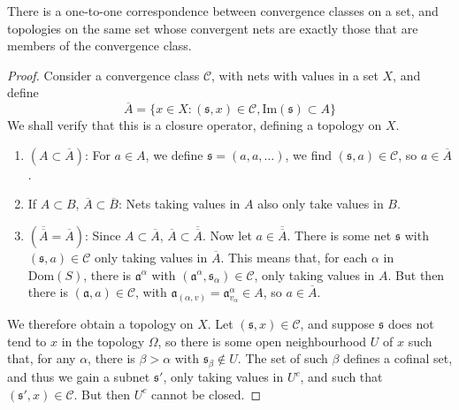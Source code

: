 \begin{theorem}
    There is a one-to-one correspondence between convergence classes on a set, and topologies on the same set whose convergent nets are exactly those that are members of the convergence class.
\end{theorem}
\begin{proof}
    Consider a convergence class $\mathcal{C}$, with nets with values in a set $X$, and define
    \[ \overline{A} = \{ x \in X : (\mathfrak{s}, x) \in \mathcal{C}, \text{Im}(\mathfrak{s}) \subset A \} \]
    We shall verify that this is a closure operator, defining a topology on $X$.
    \begin{enumerate}
        \item $(A \subset \overline{A})$: For $a \in A$, we define $\mathfrak{s} = (a,a,\dots)$, we find $(\mathfrak{s},a) \in \mathcal{C}$, so $a \in \overline{A}$.
        \item If $A \subset B$, $\overline{A} \subset \overline{B}$: Nets taking values in $A$ also only take values in $B$.
        \item $(\overline{\overline{A}} = \overline{A})$: Since $A \subset \overline{A}$, $\overline{A} \subset \overline{\overline{A}}$. Now let $a \in \overline{\overline{A}}$. There is some net $\mathfrak{s}$ with $(\mathfrak{s},a) \in \mathcal{C}$ only taking values in $\overline{A}$. This means that, for each $\alpha$ in $\text{Dom}(S)$, there is $\mathfrak{a}^\alpha$ with $(\mathfrak{a}^\alpha, \mathfrak{s}_\alpha) \in \mathcal{C}$, only taking values in $A$. But then there is $(\mathfrak{a}, a) \in \mathcal{C}$, with $\mathfrak{a}_{(\alpha, v)} = \mathfrak{a}^\alpha_{v_\alpha} \in A$, so $a \in \overline{A}$.
    \end{enumerate}
    We therefore obtain a topology on $X$. Let $(\mathfrak{s},x) \in \mathcal{C}$, and suppose $\mathfrak{s}$ does not tend to $x$ in the topology $\Omega$, so there is some open neighbourhood $U$ of $x$ such that, for any $\alpha$, there is $\beta > \alpha$ with $\mathfrak{s}_\beta \not \in U$. The set of such $\beta$ defines a cofinal set, and thus we gain a subnet $\mathfrak{s}'$, only taking values in $U^c$, and such that $(\mathfrak{s}',x) \in \mathcal{C}$. But then $U^c$ cannot be closed.


\end{proof}
